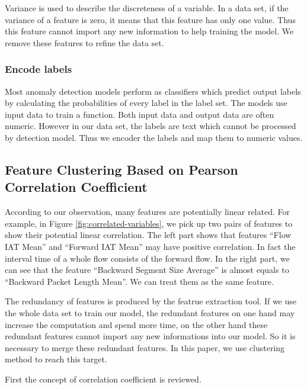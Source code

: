 \documentclass{ieeeaccess}
\theoremstyle{definition}
\begin{document}
Variance is used to describe the discreteness of a variable. In a data set, if the variance of a feature is zero, it means that this feature has only one value. Thus this feature cannot import any new information to help training the model. We remove these features to refine the data set.

\subsubsection{Encode labels}

Most anomaly detection models perform as classifiers which predict output labels by calculating the probabilities of every label in the label set. The models use input data to train a function. Both input data and output data are often numeric. However in our data set, the labels are text which cannot be processed by detection model. Thus we encoder the labels and map them to numeric values.

\subsection{Feature Clustering Based on Pearson Correlation Coefficient}

According to our observation, many features are potentially linear related. For example, in Figure \ref{fig:correlated-variables}, we pick up two pairs of features to show their potential linear correlation. The left part shows that features ``Flow IAT Mean'' and ``Forward IAT Mean'' may have positive correlation. In fact the interval time of a whole flow consists of the forward flow. In the right part, we can see that the feature ``Backward Segment Size Average'' is almost equals to ``Backward Packet Length Mean''. We can treat them as the same feature.

The redundancy of features is produced by the featrue extraction tool. If we use the whole data set to train our model, the redundant features on one hand may increase the computation and spend more time, on the other hand these redundant features cannot import any new informations into our model. So it is necessary to merge these redundant features. In this paper, we use clustering method to reach this target.

First the concept of correlation coefficient is reviewed.
\end{document}
